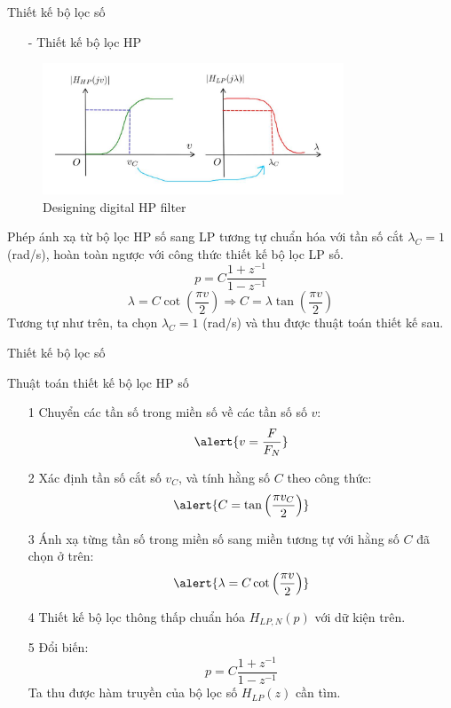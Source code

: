 \documentclass[8pt]{beamer}
\begin{document}
\begin{frame}{Thiết kế bộ lọc số}
\begin{itemize}
	\item[-] Thiết kế bộ lọc HP
\end{itemize}
\begin{figure}[h]
	\includegraphics[width=0.8\textwidth]{28.jpg}
	\caption{Designing digital HP filter}			\label{fig:re2}
		\end{figure}
		Phép ánh xạ từ bộ lọc HP số sang LP tương tự chuẩn hóa với tần số cắt $\lambda_{C}=1$ (rad/s), hoàn toàn ngược với công thức thiết kế bộ lọc LP số.
		$$p=C\frac{1+z^{-1}}{1-z^{-1}}$$
		$$\lambda=C\cot{\left(\frac{\pi v}{2}\right)}\Rightarrow C=\lambda\tan{\left(\frac{\pi v}{2}\right)}$$
		Tương tự như trên, ta chọn $\lambda_{C}=1$ (rad/s) và thu được thuật toán thiết kế sau.
\end{frame}
\begin{frame}{Thiết kế bộ lọc số}
\begin{block}{Thuật toán thiết kế bộ lọc HP số}
	\begin{enumerate}
	\item[1] Chuyển các tần số trong miền số về các tần số số $v$:
		$$\alert{v=\frac{F}{F_{N}}}$$
	\item[2] Xác định tần số cắt số $v_{C}$, và tính hằng số $C$ theo công thức:
$$\alert{C=\tan{\left(\frac{\pi v_{C}}{2}\right)}}$$
\item[3] Ánh xạ từng tần số trong miền số sang miền tương tự với hằng số $C$ đã chọn ở trên:
	$$\alert{\lambda=C\cot{\left(\frac{\pi v}{2}\right)}}$$
\item[4] Thiết kế bộ lọc thông thấp chuẩn hóa $H_{LP,N}(p)$ với dữ kiện trên.
\item[5] Đổi biến:
	$$p=C\frac{1+z^{-1}}{1-z^{-1}}$$
	 Ta thu được hàm truyền của bộ lọc số $H_{LP}(z)$ cần tìm.
	\end{enumerate}
	\end{block}

\end{frame}
\end{document}
